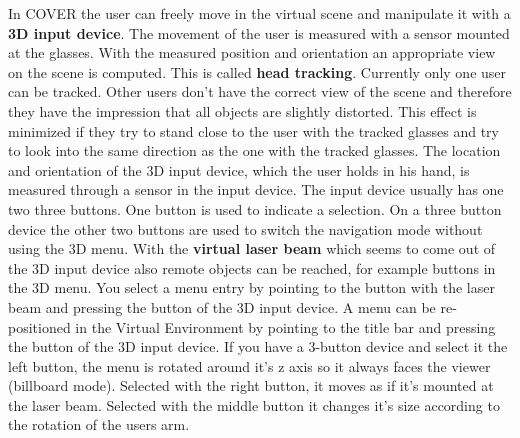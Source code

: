 In COVER the user can freely move in the virtual scene  
and manipulate it with a {\bf 3D input device}.\newline
\newline
The movement of the user is measured with a sensor 
mounted at the glasses. With the measured position and orientation an 
appropriate view on the scene is computed. This is called {\bf head tracking}.
Currently only one user can be tracked. Other users don't have the correct 
view of the scene and therefore they have the impression that all objects 
are slightly distorted. This effect is minimized if they try to stand close 
to the user with the tracked glasses and try to look into the same 
direction as the one with the tracked glasses.\newline 
\newline
The location and orientation of the 3D input device, which the user
holds in his hand, is measured through a sensor in the input device.
The input device usually has one two three buttons. One button is 
used to indicate a selection. On a three button device the other two buttons
are used to switch the navigation mode without using the 3D menu.\newline
\newline
With the {\bf virtual laser beam} which seems to come out of the 3D input device also
remote objects can be reached, for example buttons in the 3D menu.\newline
\newline
You select a menu entry
by pointing to the button with the laser beam and pressing the 
button of the 3D input device. 
A menu can be re-positioned in the Virtual Environment by pointing to the title bar
and pressing the button of the 3D input device. If you have a 3-button device
and select it the left button, the menu is rotated around it's z axis so it 
always faces the viewer (billboard mode). Selected with the right button, it moves as if it's
mounted at the laser beam. Selected with the middle button
it changes it's size according to the rotation of the users arm.\newline 
